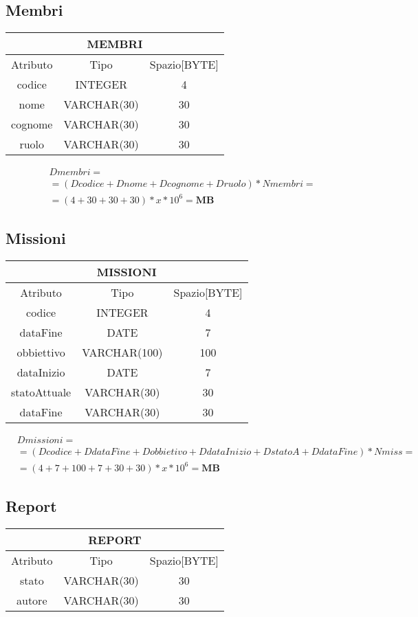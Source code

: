 \subsection{Membri}
\begin{tabular}{ |c|c|c|}
  \hline
  \multicolumn{3}{|c|}{\textbf{MEMBRI}}\\
  \hline
  Atributo & Tipo & Spazio[BYTE] \\
  \hline
  codice & INTEGER & 4 \\
  nome & VARCHAR(30) & 30 \\
  cognome & VARCHAR(30) & 30 \\
  ruolo & VARCHAR(30) & 30\\
  \hline
\end{tabular}
\begin{equation}
  \begin{aligned}
    &Dmembri =\\
    &=(Dcodice + Dnome +Dcognome +Druolo) * Nmembri =\\
    &=(4+30+30+30) *x*10^6= \textbf{MB}
  \end{aligned}
\end{equation}
\subsection{Missioni}
\begin{tabular}{ |c|c|c|}
  \hline
  \multicolumn{3}{|c|}{\textbf{MISSIONI}}\\
  \hline
  Atributo & Tipo & Spazio[BYTE] \\
  \hline
  codice & INTEGER & 4 \\
  dataFine & DATE & 7 \\
  obbiettivo & VARCHAR(100) & 100 \\
  dataInizio & DATE & 7 \\
  statoAttuale  & VARCHAR(30) & 30 \\
  dataFine & VARCHAR(30) & 30 \\
  \hline
\end{tabular}
\begin{equation}
  \begin{aligned}
    &Dmissioni =\\
    &=(Dcodice+DdataFine+Dobbietivo+DdataInizio+DstatoA+DdataFine)*Nmiss=\\
    &=(4+7+100+7+30+30)*x*10^6= \textbf{MB}
  \end{aligned}
\end{equation}
\subsection{Report}
\begin{tabular}{ |c|c|c|}
  \hline
  \multicolumn{3}{|c|}{\textbf{REPORT}}\\
  \hline
  Atributo & Tipo & Spazio[BYTE] \\
  \hline
  stato & VARCHAR(30) & 30 \\
  autore & VARCHAR(30) & 30\\
  \hline
\end{tabular}

